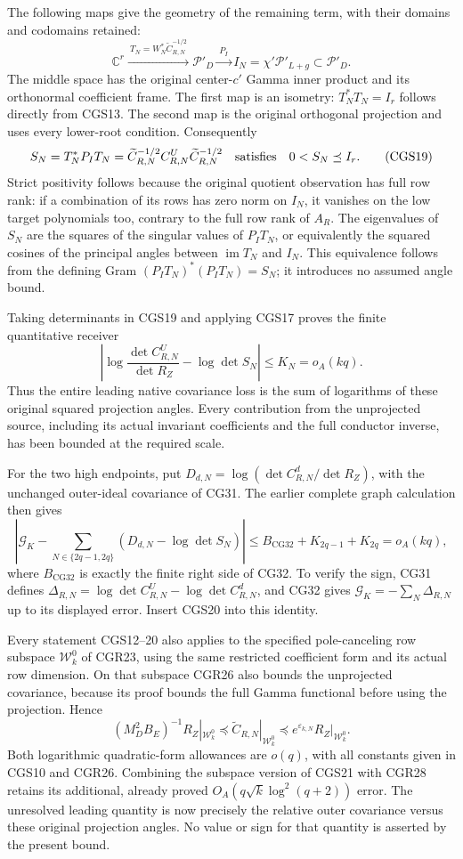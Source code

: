 The following maps give the geometry of the remaining term, with their domains and codomains retained: \[
\mathbb C^r\xrightarrow{\ T_N=W_N^*\widetilde C_{R,N}^{-1/2}\ }
\mathcal P'_D\xrightarrow{\ P_I\ }
I_N=\chi'\mathcal P'_{L+g}\subset\mathcal P'_D.
\tag{CGS18}
\] The middle space has the original center-\(c'\) Gamma inner product and its orthonormal coefficient frame. The first map is an isometry: \(T_N^*T_N=I_r\) follows directly from CGS13. The second map is the original orthogonal projection and uses every lower-root condition. Consequently \[
S_N=T_N^*P_IT_N
=\widetilde C_{R,N}^{-1/2}C_{R,N}^U
                   \widetilde C_{R,N}^{-1/2}
\quad\hbox{satisfies}\quad 0<S_N\preceq I_r.
\tag{CGS19}
\] Strict positivity follows because the original quotient observation has full row rank: if a combination of its rows has zero norm on \(I_N\), it vanishes on the low target polynomials too, contrary to the full row rank of \(A_R\). The eigenvalues of \(S_N\) are the squares of the singular values of \(P_IT_N\), or equivalently the squared cosines of the principal angles between \(\operatorname{im}T_N\) and \(I_N\). This equivalence follows from the defining Gram \((P_IT_N)^*(P_IT_N)=S_N\); it introduces no assumed angle bound.

Taking determinants in CGS19 and applying CGS17 proves the finite quantitative receiver \[
\boxed{\left|\log\frac{\det C_{R,N}^U}{\det R_Z}
                 -\log\det S_N\right|\le K_N=o_A(kq).}
\tag{CGS20}
\] Thus the entire leading native covariance loss is the sum of logarithms of these original squared projection angles. Every contribution from the unprojected source, including its actual invariant coefficients and the full conductor inverse, has been bounded at the required scale.

For the two high endpoints, put \(D_{d,N}=\log(\det C_{R,N}^d/\det R_Z)\), with the unchanged outer-ideal covariance of CG31. The earlier complete graph calculation then gives \[
\left|\mathcal G_K-
\sum_{N\in\{2q-1,2q\}}(D_{d,N}-\log\det S_N)\right|
\le B_{\mathrm{CG32}}+K_{2q-1}+K_{2q}=o_A(kq),
\tag{CGS21}
\] where \(B_{\mathrm{CG32}}\) is exactly the finite right side of CG32. To verify the sign, CG31 defines \(\Delta_{R,N}=\log\det C_{R,N}^U-\log\det C_{R,N}^d\), and CG32 gives \(\mathcal G_K=-\sum_N\Delta_{R,N}\) up to its displayed error. Insert CGS20 into this identity.

Every statement CGS12--20 also applies to the specified pole-canceling row subspace \(\mathcal W_k^0\) of CGR23, using the same restricted coefficient form and its actual row dimension. On that subspace CGR26 also bounds the unprojected covariance, because its proof bounds the full Gamma functional before using the projection. Hence \[
(M_D^2B_E)^{-1}R_Z|_{\mathcal W_k^0}
\preceq\widetilde C_{R,N}|_{\mathcal W_k^0}
\preceq e^{\varepsilon_{k,N}}R_Z|_{\mathcal W_k^0}.
\tag{CGS22}
\] Both logarithmic quadratic-form allowances are \(o(q)\), with all constants given in CGS10 and CGR26. Combining the subspace version of CGS21 with CGR28 retains its additional, already proved \(O_A(q\sqrt{k}\log^2(q+2))\) error. The unresolved leading quantity is now precisely the relative outer covariance versus these original projection angles. No value or sign for that quantity is asserted by the present bound.

